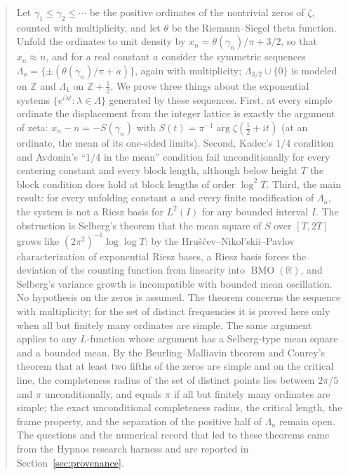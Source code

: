 \documentclass[11pt]{article}
\DeclareMathOperator{\BMO}{BMO}
\newcommand{\R}{\mathbb{R}}
\newcommand{\Lam}{\Lambda}
\begin{document}
\hypnosmaketitle

\begin{abstract}
Let $\gamma_1\le\gamma_2\le\cdots$ be the positive ordinates of the nontrivial zeros of $\zeta$, counted with multiplicity, and let $\theta$ be the Riemann--Siegel theta function. Unfold the ordinates to unit density by $x_n=\theta(\gamma_n)/\pi+3/2$, so that $x_n\approx n$, and for a real constant $a$ consider the symmetric sequences $\Lam_a=\{\pm(\theta(\gamma_n)/\pi+a)\}$, again with multiplicity; $\Lam_{3/2}\cup\{0\}$ is modeled on $\mathbb Z$ and $\Lam_1$ on $\mathbb Z+\tfrac12$. We prove three things about the exponential systems $\{e^{i\lambda t}:\lambda\in\Lam\}$ generated by these sequences. First, at every simple ordinate the displacement from the integer lattice is exactly the argument of zeta: $x_n-n=-S(\gamma_n)$ with $S(t)=\pi^{-1}\arg\zeta(\tfrac12+it)$ (at an ordinate, the mean of its one-sided limits). Second, Kadec's $1/4$ condition and Avdonin's ``$1/4$ in the mean'' condition fail unconditionally for every centering constant and every block length, although below height $T$ the block condition does hold at block lengths of order $\log^2 T$. Third, the main result: for every unfolding constant $a$ and every finite modification of $\Lam_a$, the system is not a Riesz basis for $L^2(I)$ for any bounded interval $I$. The obstruction is Selberg's theorem that the mean square of $S$ over $[T,2T]$ grows like $(2\pi^2)^{-1}\log\log T$: by the Hru\v{s}\v{c}ev--Nikol'skii--Pavlov characterization of exponential Riesz bases, a Riesz basis forces the deviation of the counting function from linearity into $\BMO(\R)$, and Selberg's variance growth is incompatible with bounded mean oscillation. No hypothesis on the zeros is assumed. The theorem concerns the sequence with multiplicity; for the set of distinct frequencies it is proved here only when all but finitely many ordinates are simple. The same argument applies to any $L$-function whose argument has a Selberg-type mean square and a bounded mean. By the Beurling--Malliavin theorem and Conrey's theorem that at least two fifths of the zeros are simple and on the critical line, the completeness radius of the set of distinct points lies between $2\pi/5$ and $\pi$ unconditionally, and equals $\pi$ if all but finitely many ordinates are simple; the exact unconditional completeness radius, the critical length, the frame property, and the separation of the positive half of $\Lam_a$ remain open. The questions and the numerical record that led to these theorems came from the Hypnos research harness and are reported in Section~\ref{sec:provenance}.
\end{abstract}
\end{document}
